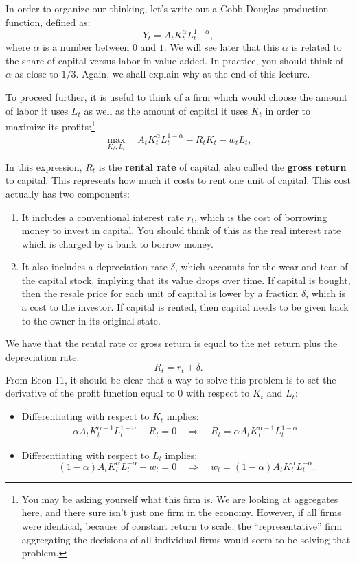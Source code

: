 \documentclass[]{book}
\providecommand{\tightlist}{%
  \setlength{\itemsep}{0pt}\setlength{\parskip}{0pt}}
\let\rmarkdownfootnote\footnote%
\def\footnote{\protect\rmarkdownfootnote}
\theoremstyle{definition}
\theoremstyle{definition}
\theoremstyle{definition}
\theoremstyle{remark}
\begin{document}
In order to organize our thinking, let's write out a Cobb-Douglas
production function, defined as:
\[Y_t = A_t K_t^{\alpha} L_t^{1-\alpha},\] where \(\alpha\) is a number
between \(0\) and \(1\). We will see later that this \(\alpha\) is
related to the share of capital versus labor in value added. In
practice, you should think of \(\alpha\) as close to \(1/3\). Again, we
shall explain why at the end of this lecture.

To proceed further, it is useful to think of a firm which would choose
the amount of labor it uses \(L_t\) as well as the amount of capital it
uses \(K_t\) in order to maximize its profits:\footnote{You may be
  asking yourself what this firm is. We are looking at aggregates here,
  and there sure isn't just one firm in the economy. However, if all
  firms were identical, because of constant return to scale, the
  ``representative'' firm aggregating the decisions of all individual
  firms would seem to be solving that problem.}
\[\max_{K_t, L_t} \quad A_t K_t^{\alpha} L_t^{1-\alpha} - R_t K_t - w_t L_t,\]

In this expression, \(R_t\) is the \textbf{rental rate} of capital, also
called the \textbf{gross return} to capital. This represents how much it
costs to rent one unit of capital. This cost actually has two
components:

\begin{enumerate}
\def\labelenumi{\arabic{enumi}.}
\item
  It includes a conventional interest rate \(r_t\), which is the cost of
  borrowing money to invest in capital. You should think of this as the
  real interest rate which is charged by a bank to borrow money.
\item
  It also includes a depreciation rate \(\delta\), which accounts for
  the wear and tear of the capital stock, implying that its value drops
  over time. If capital is bought, then the resale price for each unit
  of capital is lower by a fraction \(\delta\), which is a cost to the
  investor. If capital is rented, then capital needs to be given back to
  the owner in its original state.
\end{enumerate}

We have that the rental rate or gross return is equal to the net return
plus the depreciation rate: \[\boxed{R_t = r_t + \delta}.\] From Econ
11, it should be clear that a way to solve this problem is to set the
derivative of the profit function equal to \(0\) with respect to \(K_t\)
and \(L_t\):

\begin{itemize}
\tightlist
\item
  Differentiating with respect to \(K_t\) implies: \[
  \begin{aligned}
  \alpha A_t K_t^{\alpha-1} L_t^{1-\alpha} - R_t = 0 \quad \Rightarrow \quad \boxed{R_t = \alpha A_t K_t^{\alpha-1} L_t^{1-\alpha}}.
  \end{aligned}
  \]
\item
  Differentiating with respect to \(L_t\) implies:
  \[(1-\alpha) A_t K_t^{\alpha} L_t^{-\alpha} - w_t = 0 \quad \Rightarrow \quad \boxed{w_t = (1-\alpha) A_t K_t^{\alpha} L_t^{-\alpha}}.\]
\end{itemize}
\end{document}
